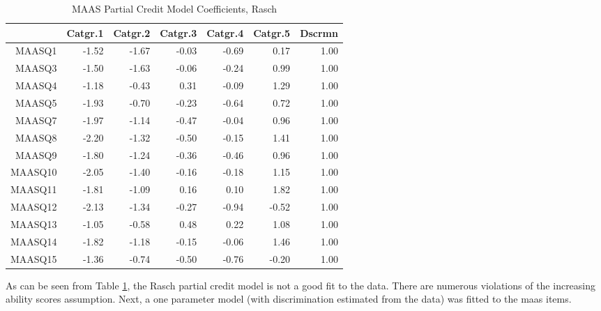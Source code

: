 \documentclass{article}
\begin{document}
\begin{table}[ht]
\centering
\begin{tabular}{rrrrrrr}
  \hline
 & Catgr.1 & Catgr.2 & Catgr.3 & Catgr.4 & Catgr.5 & Dscrmn \\ 
  \hline
MAASQ1 & -1.52 & -1.67 & -0.03 & -0.69 & 0.17 & 1.00 \\ 
  MAASQ3 & -1.50 & -1.63 & -0.06 & -0.24 & 0.99 & 1.00 \\ 
  MAASQ4 & -1.18 & -0.43 & 0.31 & -0.09 & 1.29 & 1.00 \\ 
  MAASQ5 & -1.93 & -0.70 & -0.23 & -0.64 & 0.72 & 1.00 \\ 
  MAASQ7 & -1.97 & -1.14 & -0.47 & -0.04 & 0.96 & 1.00 \\ 
  MAASQ8 & -2.20 & -1.32 & -0.50 & -0.15 & 1.41 & 1.00 \\ 
  MAASQ9 & -1.80 & -1.24 & -0.36 & -0.46 & 0.96 & 1.00 \\ 
  MAASQ10 & -2.05 & -1.40 & -0.16 & -0.18 & 1.15 & 1.00 \\ 
  MAASQ11 & -1.81 & -1.09 & 0.16 & 0.10 & 1.82 & 1.00 \\ 
  MAASQ12 & -2.13 & -1.34 & -0.27 & -0.94 & -0.52 & 1.00 \\ 
  MAASQ13 & -1.05 & -0.58 & 0.48 & 0.22 & 1.08 & 1.00 \\ 
  MAASQ14 & -1.82 & -1.18 & -0.15 & -0.06 & 1.46 & 1.00 \\ 
  MAASQ15 & -1.36 & -0.74 & -0.50 & -0.76 & -0.20 & 1.00 \\ 
   \hline
\end{tabular}
\caption{MAAS Partial Credit Model Coefficients, Rasch} 
\label{tab:maaspcmrasch}
\end{table}
As can be seen from Table \ref{tab:maaspcmrasch}, the Rasch partial credit model is not a good fit to the data. There are numerous violations of the increasing ability scores assumption. Next, a one parameter model (with discrimination estimated from the data) was fitted to the maas items. 
\end{document}

